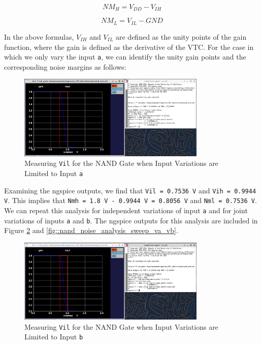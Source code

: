 \documentclass[fleqn]{article}
\begin{document}
	\begin{equation}
		NM_H = V_{DD} - V_{IH}
		\label{eq::noise_margin_high}
	\end{equation}
	
	\begin{equation}
		NM_L = V_{IL} - GND
		\label{eq::noise_margin_low}
	\end{equation}
	
	In the above formulas, $V_{IH}$ and $V_{IL}$ are defined as the unity points of the gain function, where the gain is defined as the derivative of the VTC. For the case in which we only vary the input \texttt{a}, we can identify the unity gain points and the corresponding noise margins as follows:
	
	\begin{figure}[H]
		\centerline{\includegraphics[width=0.8\textwidth]{nand_noise_analysis_sweep_va.png}}
		\caption{Measuring \texttt{Vil} for the NAND Gate when Input Variations are Limited to Input \texttt{a}}
		\label{fig::nand_noise_analysis_sweep_va}
	\end{figure}
	
	Examining the ngspice outputs, we find that \texttt{Vil = 0.7536 V} and \texttt{Vih = 0.9944 V}. This implies that \texttt{Nmh = 1.8 V - 0.9944 V = 0.8056 V} and \texttt{Nml = 0.7536 V}. We can repeat this analysis for independent variations of input \texttt{a} and for joint variations of inputs \texttt{a} and \texttt{b}. The ngspice outputs for this analysis are included in Figure \ref{fig::nand_noise_analysis_sweep_vb} and \ref{fig::nand_noise_analysis_sweep_va_vb}.
	
	\begin{figure}[H]
		\centerline{\includegraphics[width=0.8\textwidth]{nand_noise_analysis_sweep_vb.png}}
		\caption{Measuring \texttt{Vil} for the NAND Gate when Input Variations are Limited to Input \texttt{b}}
		\label{fig::nand_noise_analysis_sweep_vb}
	\end{figure}
	
\end{document}
